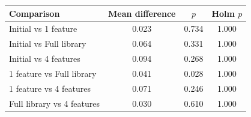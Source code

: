 \begin{tabular}{p{}ccc}
\toprule
Comparison & Mean difference & $p$ & Holm $p$ \\
\midrule
Initial vs 1 feature & 0.023 & 0.734 & 1.000 \\
Initial vs Full library & 0.064 & 0.331 & 1.000 \\
Initial vs 4 features & 0.094 & 0.268 & 1.000 \\
1 feature vs Full library & 0.041 & 0.028 & 1.000 \\
1 feature vs 4 features & 0.071 & 0.246 & 1.000 \\
Full library vs 4 features & 0.030 & 0.610 & 1.000 \\
\bottomrule
\end{tabular}
